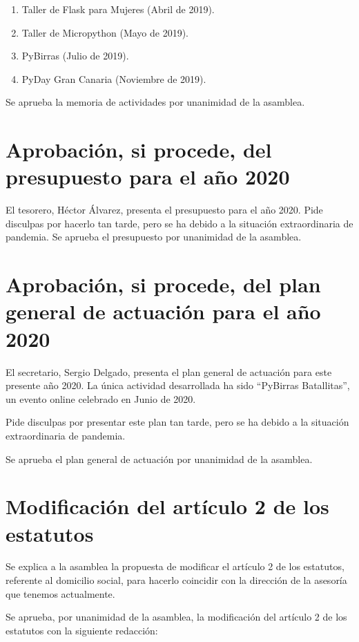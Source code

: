 \documentclass[a4paper, 12pt]{article}
\begin{document}
\begin{enumerate}
    \item Taller de Flask para Mujeres (Abril de 2019).
    \item Taller de Micropython (Mayo de 2019).
    \item PyBirras (Julio de 2019).
    \item PyDay Gran Canaria (Noviembre de 2019).
\end{enumerate}

Se aprueba la memoria de actividades por unanimidad de la asamblea.

\section{Aprobación, si procede, del presupuesto para el año 2020}

El tesorero, Héctor Álvarez, presenta el presupuesto para el año 2020. Pide disculpas por hacerlo tan tarde, pero se ha debido a la situación extraordinaria de pandemia. Se aprueba el presupuesto por unanimidad de la asamblea.

\section{Aprobación, si procede, del plan general de actuación para el año 2020}

El secretario, Sergio Delgado, presenta el plan general de actuación para este presente año 2020. La única actividad desarrollada ha sido ``PyBirras Batallitas'', un evento online celebrado en Junio de 2020.

Pide disculpas por presentar este plan tan tarde, pero se ha debido a la situación extraordinaria de pandemia.

Se aprueba el plan general de actuación por unanimidad de la asamblea.

\section{Modificación del artículo 2 de los estatutos}

Se explica a la asamblea la propuesta de modificar el artículo 2 de los estatutos, referente al domicilio social, para hacerlo coincidir con la dirección de la asesoría que tenemos actualmente.

Se aprueba, por unanimidad de la asamblea, la modificación del artículo 2 de los estatutos con la siguiente redacción:\\
\end{document}
